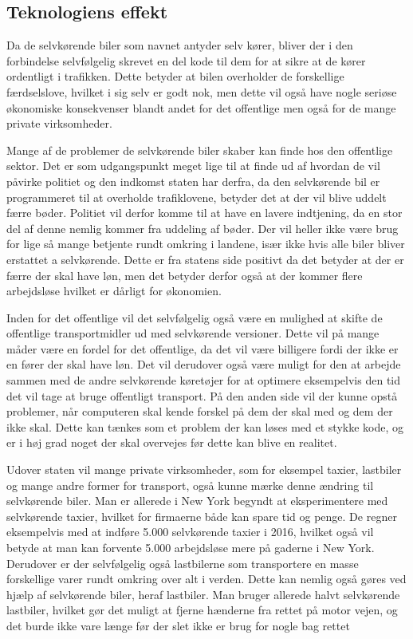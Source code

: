 \subsection{Teknologiens effekt}
Da de selvkørende biler som navnet antyder selv kører, bliver der i den forbindelse selvfølgelig skrevet en del kode til dem for at sikre at de kører ordentligt i trafikken. Dette betyder at bilen overholder de forskellige færdselslove, hvilket i sig selv er godt nok, men dette vil også have nogle seriøse økonomiske konsekvenser blandt andet for det offentlige men også for de mange private virksomheder. 

Mange af de problemer de selvkørende biler skaber kan finde hos den offentlige sektor. Det er som udgangspunkt meget lige til at finde ud af hvordan de vil påvirke politiet og den indkomst staten har derfra, da den selvkørende bil er programmeret til at overholde trafiklovene, betyder det at der vil blive uddelt færre bøder. Politiet vil derfor komme til at have en lavere indtjening, da en stor del af denne nemlig kommer fra uddeling af bøder\cite{B}. Der vil heller ikke være brug for lige så mange betjente rundt omkring i landene, især ikke hvis alle biler bliver erstattet a selvkørende. Dette er fra statens side positivt da det betyder at der er færre der skal have løn, men det betyder derfor også at der kommer flere arbejdsløse hvilket er dårligt for økonomien.

Inden for det offentlige vil det selvfølgelig også være en mulighed at skifte de offentlige transportmidler ud med selvkørende versioner. Dette vil på mange måder være en fordel for det offentlige, da det vil være billigere fordi der ikke er en fører der skal have løn. Det vil derudover også være muligt for den at arbejde sammen med de andre selvkørende køretøjer for at optimere eksempelvis den tid det vil tage at bruge offentligt transport. På den anden side vil der kunne opstå problemer, når computeren skal kende forskel på dem der skal med og dem der ikke skal. Dette kan tænkes som et problem der kan løses med et stykke kode, og er i høj grad noget der skal overvejes før dette kan blive en realitet.

Udover staten vil mange private virksomheder, som for eksempel taxier, lastbiler og mange andre former for transport, også kunne mærke denne ændring til selvkørende biler. Man er allerede i New York begyndt at eksperimentere med selvkørende taxier, hvilket for firmaerne både kan spare tid og penge. De regner eksempelvis med at indføre 5.000 selvkørende taxier i 2016, hvilket også vil betyde at man kan forvente 5.000 arbejdsløse mere på gaderne i New York. Derudover er der selvfølgelig også lastbilerne som transportere en masse forskellige varer rundt omkring over alt i verden. Dette kan nemlig også gøres ved hjælp af selvkørende biler, heraf lastbiler. Man bruger allerede halvt selvkørende lastbiler, hvilket gør det muligt at fjerne hænderne fra rettet på motor vejen, og det burde ikke vare længe før der slet ikke er brug for nogle bag rettet

